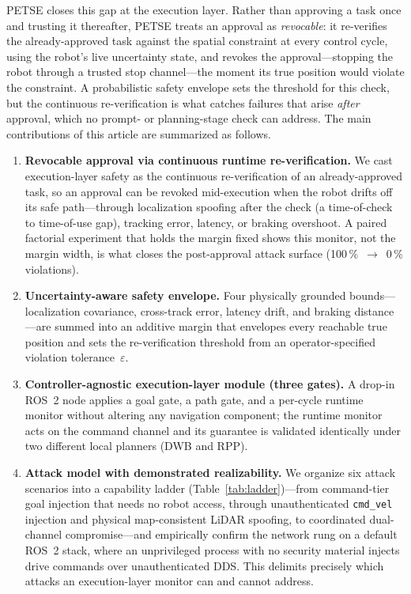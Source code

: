 \documentclass[conference]{IEEEtran}
\begin{document}
PETSE closes this gap at the execution layer. Rather than approving a task once and trusting it thereafter, PETSE treats an approval as \emph{revocable}: it re-verifies the already-approved task against the spatial constraint at every control cycle, using the robot's live uncertainty state, and revokes the approval---stopping the robot through a trusted stop channel---the moment its true position would violate the constraint. A probabilistic safety envelope sets the threshold for this check, but the continuous re-verification is what catches failures that arise \emph{after} approval, which no prompt- or planning-stage check can address. The main contributions of this article are summarized as follows.
\begin{enumerate}
\item \textbf{Revocable approval via continuous runtime re-verification.}
We cast execution-layer safety as the continuous re-verification of an already-approved task, so an approval can be revoked mid-execution when the robot drifts off its safe path---through localization spoofing after the check (a time-of-check to time-of-use gap), tracking error, latency, or braking overshoot. A paired factorial experiment that holds the margin fixed shows this monitor, not the margin width, is what closes the post-approval attack surface (100\,\%~$\rightarrow$~0\,\% violations).

\item \textbf{Uncertainty-aware safety envelope.}
Four physically grounded bounds---localization covariance, cross-track error, latency drift, and braking distance---are summed into an additive margin that envelopes every reachable true position and sets the re-verification threshold from an operator-specified violation tolerance~$\varepsilon$.

\item \textbf{Controller-agnostic execution-layer module (three gates).}
A drop-in ROS~2 node applies a goal gate, a path gate, and a per-cycle runtime monitor without altering any navigation component; the runtime monitor acts on the command channel and its guarantee is validated identically under two different local planners (DWB and RPP).

\item \textbf{Attack model with demonstrated realizability.}
We organize six attack scenarios into a capability ladder (Table~\ref{tab:ladder})---from command-tier goal injection that needs no robot access, through unauthenticated \texttt{cmd\_vel} injection and physical map-consistent LiDAR spoofing, to coordinated dual-channel compromise---and empirically confirm the network rung on a default ROS~2 stack, where an unprivileged process with no security material injects drive commands over unauthenticated DDS. This delimits precisely which attacks an execution-layer monitor can and cannot address.


\end{enumerate}
\end{document}
